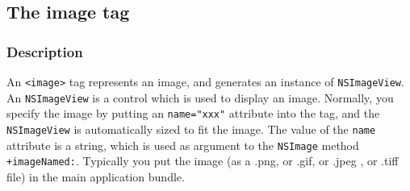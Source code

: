 %
%
%
%
%
%

\subsection{The image tag}

\subsubsection{Description}
An \texttt{<image>} tag represents an image, and generates an instance
of \texttt{NSImageView}.  An \texttt{NSImageView} is a control which
is used to display an image.  Normally, you specify the image by
putting an \texttt{name="xxx"} attribute into the tag, and the
\texttt{NSImageView} is automatically sized to fit the image.
The value of the \texttt{name} attribute is a string, which is used as
argument to the \texttt{NSImage} method \texttt{+imageNamed:}.
Typically you put the image (as a .png, or .gif, or .jpeg , or .tiff
file) in the main application bundle.

